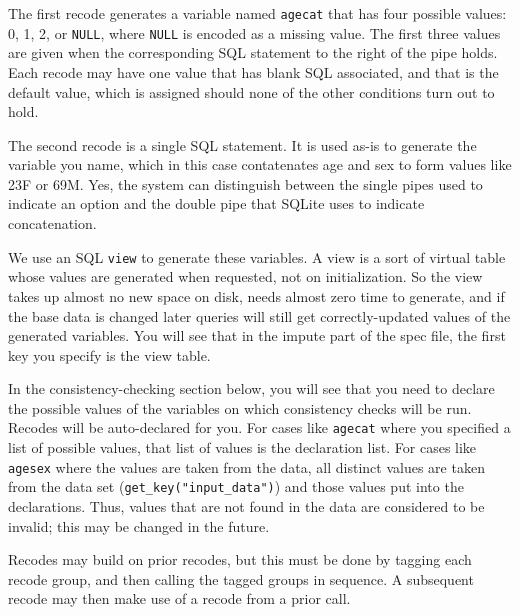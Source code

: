 \documentclass{article}
\begin{document}
The first recode generates a variable named {\tt agecat} that has four possible values: 0,
1, 2, or {\tt NULL}, where {\tt NULL} is encoded as a missing value. The first three
values are given when the corresponding SQL statement to the right of the pipe
holds. Each recode may have one value that has blank SQL associated, and that is
the default value, which is assigned should none of the other conditions turn out to
hold. 

The second recode is a single SQL statement. It is used as-is to generate the variable you
name, which in this case contatenates age and sex to form values like 23F or 69M. Yes, the
system can distinguish between the single pipes used to indicate an option and the double
pipe that SQLite uses to indicate concatenation.

We use an SQL {\tt view} to generate these variables. A view is a sort of virtual table
whose values are generated when requested, not on initialization. So the view takes up
almost no new space on disk, needs almost zero time to generate, and if the base data is
changed later queries will still get correctly-updated values of the generated variables. 
You will see that in the impute part of the spec file, the first key you specify is the 
view table.



In the consistency-checking section below, you will see that you need to declare the
possible values of the variables on which consistency checks will be run. Recodes will
be auto-declared for you. For cases like {\tt agecat} where you specified a list of
possible values, that list of values is the declaration list. For cases like {\tt agesex}
where the values are taken from the data, all distinct values are taken from the data
set ({\tt get\_key("input\_data")}) and those values put into the declarations. Thus,
values that are not found in the data are considered to be invalid; this may be changed
in the future.

Recodes may build on prior recodes, but this must be done by tagging each recode group,
and then calling the tagged groups in sequence. A subsequent recode may then make use of a
recode from a prior call.
\end{document}
